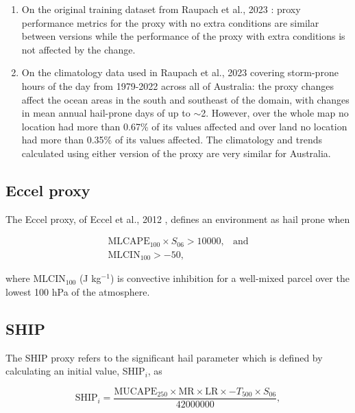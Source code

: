 \documentclass[pdflatex, sn-nature]{sn-jnl}\usepackage[]{graphicx}\usepackage[]{xcolor}
\begin{document}
\begin{enumerate}
    \item On the original training dataset from Raupach et al., 2023
    \cite{Raupach_MWR_2023}: proxy performance metrics for the proxy with no
    extra conditions are similar between versions while the performance of the
    proxy with extra conditions is not affected by the change.
    \item On the climatology data used in Raupach et al., 2023
    \cite{Raupach_npjCAS_2023} covering storm-prone hours of the day from
    1979-2022 across all of Australia: the proxy changes affect the ocean areas
    in the south and southeast of the domain, with changes in mean annual
    hail-prone days of up to $\sim$2. However, over the whole map no location
    had more than
    0.67\%
    of its values affected and over land no location had more than
    0.35\%
    of its values affected. The climatology and trends calculated using either
    version of the proxy are very similar for Australia.
\end{enumerate}

\subsection{Eccel proxy}

The Eccel proxy, of Eccel et al., 2012 \cite{Eccel_IJC_2012}, defines an
environment as hail prone when 

\begin{eqnarray}
\textrm{MLCAPE}_{100} \times S_{06} > 10000,&\textrm{and} \\
\textrm{MLCIN}_{100} > -50,
\end{eqnarray}

where MLCIN$_{100}$ (J kg$^{-1}$) is convective inhibition for a well-mixed
parcel over the lowest 100 hPa of the atmosphere. 

\subsection{SHIP}

The SHIP proxy refers to the significant hail parameter
\citep[SHIP,][]{SPC_SHIP} which is defined by calculating an initial value,
SHIP$_i$, as

\begin{equation}
\textrm{SHIP}_i = \frac{\textrm{MUCAPE}_{250} \times \textrm{MR} \times \textrm{LR} \times -T_{500} \times S_{06}}{42000000},
\label{eq:SHIP}
\end{equation}
\end{document}
